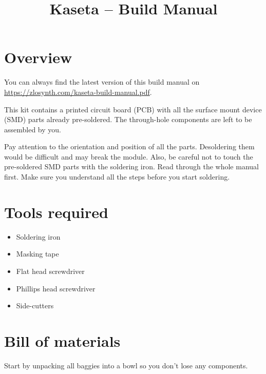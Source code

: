 \documentclass[10pt,a4paper,twocolumn]{article}
\begin{document}
\title{Kaseta -- Build Manual}
\author{}
\date{}

\maketitle

\section{Overview}

You can always find the latest version of this build manual on
\url{https://zlosynth.com/kaseta-build-manual.pdf}.

This kit contains a printed circuit board (PCB) with all the surface mount
device (SMD) parts already pre-soldered. The through-hole components are left to
be assembled by you.

Pay attention to the orientation and position of all the parts. Desoldering them
would be difficult and may break the module. Also, be careful not to touch the
pre-soldered SMD parts with the soldering iron. Read through the whole manual
first. Make sure you understand all the steps before you start soldering.

\newpage

\section{Tools required}

\begin{itemize}
  \item Soldering iron
  \item Masking tape
  \item Flat head screwdriver
  \item Phillips head screwdriver
  \item Side-cutters
\end{itemize}

\newpage

\section{Bill of materials}

Start by unpacking all baggies into a bowl so you don't lose any components.
\end{document}
